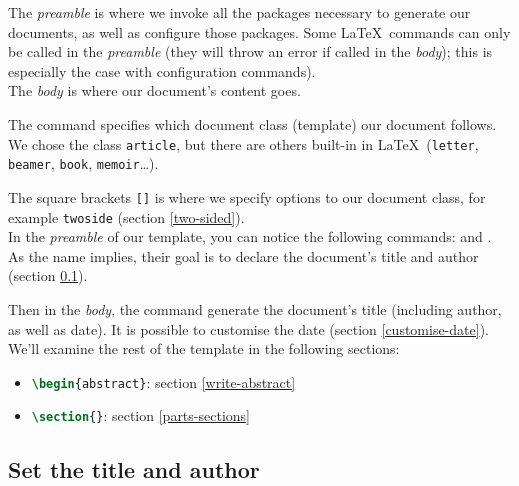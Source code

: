 \medskip

The \emph{preamble} is where we invoke all the packages necessary to generate our documents, as well as configure those packages. Some \LaTeX\ commands can only be called in the \emph{preamble} (they will throw an error if called in the \emph{body}); this is especially the case with configuration commands). \\

The \emph{body} is where our document's content goes. \\

\medskip

The  command specifies which document class (template) our document follows. We chose the class \texttt{article}, but there are others built-in in \LaTeX\ (\texttt{letter}, \texttt{beamer}, \texttt{book}, \texttt{memoir}\dots). 

The square brackets \texttt{[]} is where we specify options to our document class, for example \texttt{twoside} %
(section \ref{two-sided}). \\

In the \emph{preamble} of our template, you can notice the following commands:  and . As the name implies, their goal is to declare the document's title and author (section  \ref{set-title-author}).

Then in the \emph{body}, the command  generate the document's title (including author, as well as date). It is possible to  customise the date (section \ref{customise-date}). \\

We'll examine the rest of the template in the following sections:
\begin{itemize}
	\item \lstinline[language=tex]|\begin{abstract}|: section \ref{write-abstract}
	\item \lstinline[language=tex]|\section{}|: section \ref{parts-sections}
\end{itemize}

\bigskip

\subsection{Set the title and author} \label{set-title-author}

